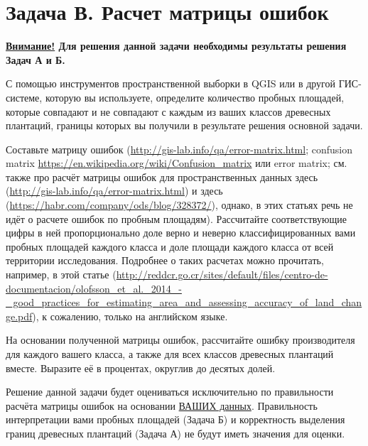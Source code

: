 \section{Задача В. Расчет матрицы ошибок}

\textbf{\underline{Внимание!} Для решения данной задачи необходимы результаты решения Задач А и Б.}

С помощью инструментов пространственной выборки в QGIS или в другой ГИС-системе, которую вы используете, определите количество пробных площадей, которые совпадают и не совпадают с каждым из ваших классов древесных плантаций, границы которых вы получили в результате решения основной задачи.

Составьте матрицу ошибок (\url{http://gis-lab.info/qa/error-matrix.html}; \linebreak confusion matrix \url{https://en.wikipedia.org/wiki/Confusion_matrix} или error \linebreak matrix; см. также про расчёт матрицы ошибок для пространственных данных здесь (\url{http://gis-lab.info/qa/error-matrix.html}) и здесь (\url{https://habr.com/company/ods/blog/328372/}), однако, в этих статьях речь не идёт о расчете ошибок по пробным площадям). Рассчитайте соответствующие цифры в ней пропорционально доле верно и неверно классифицированных вами пробных площадей каждого класса и доле площади каждого класса от всей территории исследования. Подробнее о таких расчетах можно прочитать, например, в этой статье (\url{http://reddcr.go.cr/sites/default/files/centro-de-documentacion/olofsson_et_al._2014_-_good_practices_for_es}\linebreak \url{timating_area_and_assessing_accuracy_of_land_change.pdf}), к сожалению, только на английском языке.

На основании полученной матрицы ошибок, рассчитайте ошибку производителя для каждого вашего класса, а также для всех классов древесных плантаций вместе. Выразите её в процентах, округлив до десятых долей.

Решение данной задачи будет оцениваться исключительно по правильности расчёта матрицы ошибок на основании \underline{ВАШИХ данных}. Правильность интерпретации вами пробных площадей (Задача Б) и корректность выделения границ древесных плантаций (Задача А) не будут иметь значения для оценки.